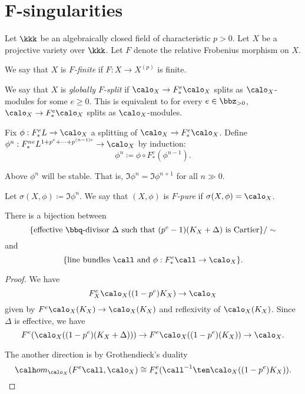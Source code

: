 \section{F-singularities}

    Let \(\kkk\) be an algebraically closed field of characteristic \(p > 0\).
    Let \(X\) be a projective variety over \(\kkk\).
    Let \(F\) denote the relative Frobenius morphism on \(X\).


    \begin{definition}
        We say that \(X\) is \emph{\(F\)-finite} if \(F: X \to X^{(p)}\) is finite.
    \end{definition}

    \begin{definition}
        We say that \(X\) is \emph{globally \(F\)-split} if \(\calo_X \to F_*^e\calo_X\) splits as \(\calo_X\)-modules for some \(e \geq 0\).
        This is equivalent to for every \(e \in \bbz_{> 0}\), \(\calo_X \to F_*^e\calo_X\) splits as \(\calo_X\)-modules.
    \end{definition}

    \begin{definition}
        Fix \(\phi: F_*^eL \to \calo_X\) a splitting of \(\calo_X \to F_*^e\calo_X\).
        Define \(\phi^n: F_*^{ne}L^{1+p^e + \cdots + p^{(n-1)e}} \to \calo_X\) by induction:
        \[ \phi^{n} \coloneqq \phi \circ F_*^e(\phi^{n-1}). \]
    \end{definition}

    \begin{theorem}
        Above \(\phi^n\) will be stable.
        That is, \(\Im \phi^n = \Im \phi^{n+1}\) for all \(n \gg 0\).
    \end{theorem}

    \begin{definition}
        Let \(\sigma(X,\phi) \coloneqq \Im \phi^n\). 
        We say that \((X,\phi)\) is \emph{\(F\)-pure} if \(\sigma(X,\phi) = \calo_X\).
    \end{definition}

    \begin{proposition}
        There is a bijection between 
        \[ \{\text{effective } \bbq \text{-divisor } \Delta \text{ such that } (p^e-1)(K_X + \Delta) \text{ is Cartier} \}/\sim \]
        and 
        \[ \{ \text{line bundles } \call \text{ and } \phi: F_*^e \call \to \calo_X \} . \]
    \end{proposition}
    \begin{proof}
        We have 
        \[ F_X^e\calo_X((1-p^e)K_X) \to \calo_X \]
        given by \(F^e\calo_X(K_X) \to \calo_X(K_X)\) and reflexivity of \(\calo_X(K_X)\).
        Since \(\Delta\) is effective, we have 
        \[ F^e(\calo_X((1-p^e)(K_X + \Delta))) \to F^e\calo_X((1-p^e)(K_X)) \to \calo_X. \]

        The another direction is by Grothendieck's duality 
        \[ \calh om_{\calo_X}(F^e\call, \calo_X) \cong F_*^e(\call^{-1}\ten\calo_X((1-p^e)K_X)). \]
    \end{proof}

